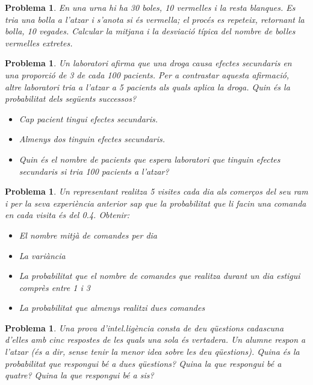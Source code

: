 \documentclass[11pt]{article}
\newcounter{prbcont}
\newtheorem{problema}[prbcont]{Problema}
\newcommand{\sol}[1]{{\textbf{\footnotetext[\the\problemes]{Sol.: #1} }}}
\begin{document}
\begin{problema}
En una urna hi ha 30 boles, 10 vermelles i la resta blanques. Es tria una bolla a l'atzar i s'anota si \'es vermella; el proc\'es es repeteix, retornant la bolla, 10 vegades. Calcular la mitjana i la desviaci\'o t\'ipica del nombre de bolles vermelles extretes. 
\end{problema}

\begin{problema}
Un laboratori afirma que una droga causa efectes secundaris en una proporci\'o de 3 de cada 100 pacients. Per a contrastar aquesta afirmaci\'o, altre laboratori tria a l'atzar a 5 pacients als quals aplica la droga. Quin \'es la probabilitat dels seg\"uents successos? 
\begin{itemize}
\item Cap pacient tingui efectes secundaris. 
\item Almenys dos tinguin efectes secundaris. 
\item Quin \'es el nombre de pacients que espera laboratori que tinguin efectes secundaris si tria 100 pacients a l'atzar?  
\end{itemize}
\end{problema}


\begin{problema}
Un representant realitza 5 visites cada dia als comer\c{c}os del seu ram i per la seva experi\`encia anterior sap que la probabilitat que li facin una comanda en cada visita \'es del 0.4. Obtenir: 
\begin{itemize}
\item El nombre mitj\`a de comandes per dia 
\item La vari\`ancia 
\item La probabilitat que el nombre de comandes que realitza durant un dia estigui compr\`es entre 1 i 3
\item La probabilitat que almenys realitzi dues comandes
\end{itemize}%
\end{problema}

\begin{problema}
Una prova d'intel.lig\`encia consta de deu q\"uestions cadascuna d'elles amb cinc respostes de les quals una sola \'es vertadera. Un alumne respon a l'atzar (\'es a dir, sense tenir la menor idea sobre les deu q\"uestions). Quina \'es la probabilitat que respongui b\'e a dues q\"uestions? Quina la que respongui b\'e a quatre? Quina la que respongui b\'e a sis?%
\end{problema}
\end{document}
